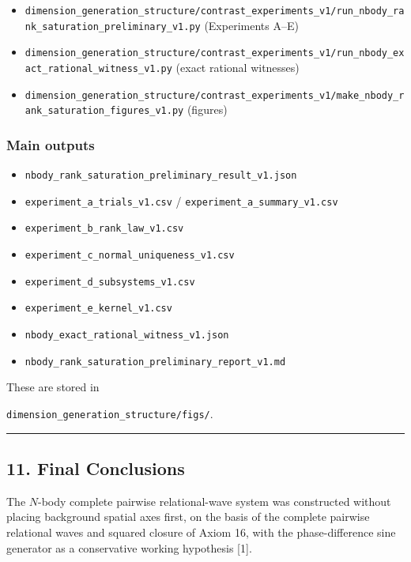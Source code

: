 \documentclass[
  a4paper,
]{article}
\providecommand{\tightlist}{%
  \setlength{\itemsep}{0pt}\setlength{\parskip}{0pt}}
\begin{document}
\begin{itemize}
\tightlist
\item
  \texttt{dimension\_generation\_structure/contrast\_experiments\_v1/run\_nbody\_rank\_saturation\_preliminary\_v1.py}
  (Experiments A--E)
\item
  \texttt{dimension\_generation\_structure/contrast\_experiments\_v1/run\_nbody\_exact\_rational\_witness\_v1.py}
  (exact rational witnesses)
\item
  \texttt{dimension\_generation\_structure/contrast\_experiments\_v1/make\_nbody\_rank\_saturation\_figures\_v1.py}
  (figures)
\end{itemize}

\subsubsection{Main outputs}\label{main-outputs}

\begin{itemize}
\tightlist
\item
  \texttt{nbody\_rank\_saturation\_preliminary\_result\_v1.json}
\item
  \texttt{experiment\_a\_trials\_v1.csv} /
  \texttt{experiment\_a\_summary\_v1.csv}
\item
  \texttt{experiment\_b\_rank\_law\_v1.csv}
\item
  \texttt{experiment\_c\_normal\_uniqueness\_v1.csv}
\item
  \texttt{experiment\_d\_subsystems\_v1.csv}
\item
  \texttt{experiment\_e\_kernel\_v1.csv}
\item
  \texttt{nbody\_exact\_rational\_witness\_v1.json}
\item
  \texttt{nbody\_rank\_saturation\_preliminary\_report\_v1.md}
\end{itemize}

These are stored in

\texttt{dimension\_generation\_structure/figs/}.

\begin{center}\rule{0.5\linewidth}{0.5pt}\end{center}

\subsection{11. Final Conclusions}\label{final-conclusions}

The \(N\)-body complete pairwise relational-wave system was constructed
without placing background spatial axes first, on the basis of the
complete pairwise relational waves and squared closure of Axiom 16, with
the phase-difference sine generator as a conservative working hypothesis
{[}1{]}.
\end{document}
